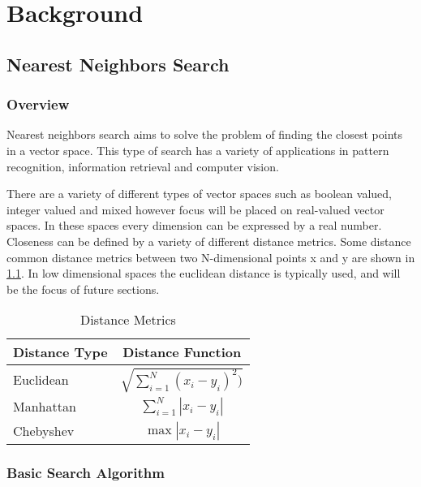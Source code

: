 \chapter{Background} %

\label{Background} %


\section{Nearest Neighbors Search}

\subsection{Overview}

Nearest neighbors search aims to solve the problem of finding the closest points in a vector space.  This type of search has a variety of applications in pattern recognition, information retrieval and computer vision.

There are a variety of different types of vector spaces such as boolean valued, integer valued and mixed however focus will be placed on real-valued vector spaces.  In these spaces every dimension can be expressed by a real number.  Closeness can be defined by a variety of different distance metrics.  Some distance common distance metrics between two N-dimensional points x and y are shown in \ref{table:distancemet}.  In low dimensional spaces the euclidean distance is typically used, and will be the focus of future sections.

\begin{table}
\begin{tabular}{ | l | c |}
	\hline
	Distance Type & Distance Function \\
	\hline
	Euclidean & $\sqrt{\sum\limits_{i=1}^N (x_i - y_i)^2)}$ \\
	\hline
	Manhattan & $\sum\limits_{i=1}^N |x_i - y_i|$ \\
	\hline
	Chebyshev & $\max{|x_i - y_i|}$ \\
	\hline
\end{tabular}
\caption{Distance Metrics}
\label{table:distancemet}
\end{table}

\subsection{Basic Search Algorithm}

